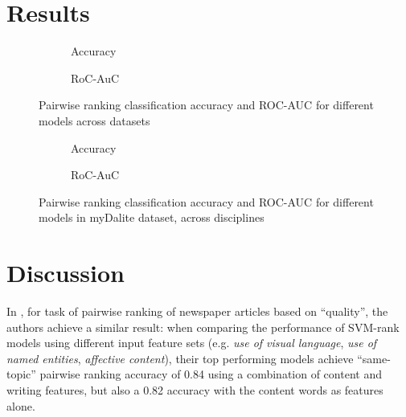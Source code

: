 \documentclass[runningheads]{llncs}
\begin{document}
\section{Results}


\begin{figure}
	\begin{subfigure}[t]{0.5\linewidth}
		\centering
		\scalebox{0.5}{}
		\caption{Accuracy}
	\end{subfigure}%
	\qquad
	\begin{subfigure}[t]{0.5\linewidth}
		\centering
		\scalebox{0.5}{}
		\caption{RoC-AuC}
	\end{subfigure}
		\caption{Pairwise ranking classification accuracy and ROC-AUC for 
		different models across datasets}
	\label{fig:performance}
\end{figure}


\begin{figure}
	\begin{subfigure}[t]{0.5\linewidth}
		\centering
		\scalebox{0.5}{}
		\caption{Accuracy}
	\end{subfigure}%
	\qquad
	\begin{subfigure}[t]{0.5\linewidth}
		\centering
		\scalebox{0.5}{}
		\caption{RoC-AuC}
	\end{subfigure}	
		\caption{Pairwise ranking classification accuracy and ROC-AUC for 
		different models in myDalite dataset, across disciplines}
		\label{fig:performance_dalite}
\end{figure}



\section{Discussion}

In \cite{louis_what_2013}, for task of pairwise ranking of newspaper articles 
based on ``quality'', the authors achieve a similar result: when comparing the 
performance of SVM-rank models using different input feature sets (e.g. 
\textit{use of visual language}, \textit{use of named entities}, 
\textit{affective content}), their top performing models achieve ``same-topic'' 
pairwise ranking accuracy of 0.84 using a combination of content and writing 
features, but also a 0.82 accuracy with the content words as features alone.
\end{document}
